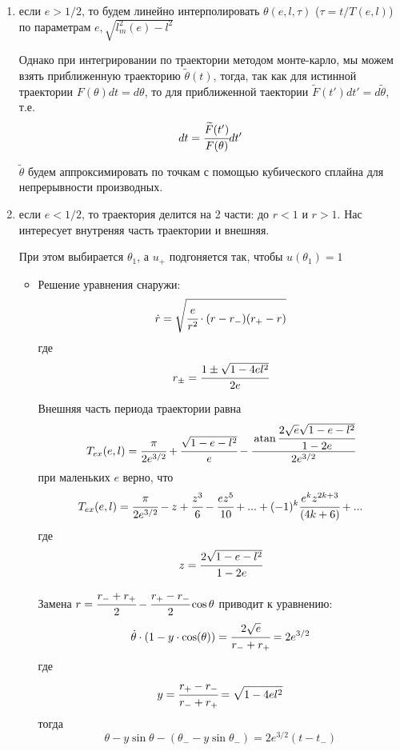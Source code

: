 	\begin{enumerate}
		\item если $e > 1/2$, то будем линейно интерполировать $\theta(e,l,\tau)$ ($\tau = t/T(e,l)$) по параметрам $e, \sqrt{l^2_m(e) - l^2}$
		
		Однако при интегрировании по траектории методом монте-карло, мы можем взять приближенную траекторию $\widetilde{\theta}(t)$, тогда, так как для истинной траектории $F(\theta)dt = d\theta$, то для приближенной таектории $\widetilde{F}(t')dt' = d\widetilde{\theta}$, т.е. 
		\begin{equation*}
			dt = \cfrac{\widetilde{F}(t')}{F(\theta)} dt'
		\end{equation*}
		
		$\widetilde{\theta}$ будем аппроксимировать по точкам с помощью кубического сплайна для непрерывности производных.
		
		\item если $e < 1/2$, то траектория делится на 2 части: до $r < 1$ и $r > 1$. Нас интересует внутреняя часть траектории и внешняя.
		
		При этом выбирается $\theta_1$, а $u_{+}$ подгоняется так, чтобы $u(\theta_1) = 1$
		
		\begin{itemize}
			\item Решение уравнения снаружи:
			\begin{equation*}
				\dot{r} = \sqrt{\cfrac{e}{r^2}\cdot (r-r_{-})(r_{+}-r)}
			\end{equation*}
			где 
			\begin{equation*}
				r_{\pm} = \cfrac{1 \pm \sqrt{1 - 4el^2} }{2e}
			\end{equation*}
			
			Внешняя часть периода траектории равна
			\begin{equation}
				T_{ex}(e,l) = \cfrac{\pi}{2e^{3/2}} + \cfrac{\sqrt{1-e-l^2}}{e} - 
				\cfrac{\atan{\cfrac{2\sqrt{e}\sqrt{1-e-l^2}}{1-2e}}}{2e^{3/2}}
			\end{equation}
			при маленьких $e$ верно, что
			\begin{equation}
				T_{ex}(e,l) = \cfrac{\pi}{2e^{3/2}} - 
				z + \cfrac{z^3}{6}-\cfrac{ez^5}{10} +...+ (-1)^k\cfrac{e^{k}z^{2k+3}}{(4k+6)}
				+...
			\end{equation}
			где
			\begin{equation}
				z = \cfrac{2\sqrt{1-e-l^2}}{1-2e}
			\end{equation}
			
			Замена $r = \cfrac{r_{-}+r_{+}}{2} - \cfrac{r_{+}-r_{-}}{2} \cos{\theta}$ приводит к уравнению:
			\begin{equation*}
				\dot{\theta}\cdot(1 - y\cdot\cos(\theta)) = \cfrac{2\sqrt{e}}{r_{-}+r_{+}} = 2e^{3/2}
			\end{equation*}
				где 
			\begin{equation*}
				y = \cfrac{r_{+}-r_{-}}{r_{-}+r_{+}} = \sqrt{1 - 4el^2}
			\end{equation*}
			тогда 
			\begin{equation*}
				\theta - y \sin{\theta} - (\theta_{-} - y\sin{\theta_{-}}) = 2e^{3/2}(t-t_{-})
			\end{equation*}
			

\end{itemize}
\end{enumerate}

